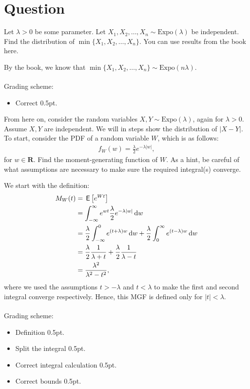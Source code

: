 \section*{Question}

\begin{exercise}[0.5]
Let $\lambda>0$ be some parameter. Let $X_1,X_2,\dots,X_n \sim\text{Expo}(\lambda)$ be independent. Find the distribution of $\min{\{X_1,X_2,\dots,X_n\}}$. You can use results from the book here.
\begin{solution}
By the book, we know that $\min{\{X_1,X_2,\dots,X_n\}}\sim\text{Expo}(n\lambda)$.
\\\\
Grading scheme:
\begin{itemize}
    \item Correct 0.5pt.
\end{itemize}
\end{solution}
\end{exercise}

\begin{exercise}[2]
From here on, consider the random variables $X,Y\sim\text{Expo}(\lambda)$, again for $\lambda>0$. Assume $X,Y$ are independent. We will in steps show the distribution of $\left|X-Y\right|$.\\ To start, consider the PDF of a random variable $W$, which is as follows:
\begin{align*}
    f_W(w) = \frac{\lambda}{2}e^{-\lambda\left|w\right|},
\end{align*}
for $w\in\mathbf{R}$. Find the moment-generating function of $W$. As a hint, be careful of what assumptions are necessary to make sure the required integral(s) converge.
\begin{solution}
We start with the definition:
\begin{align*}
    M_W(t) &= \E{e^{W t}}\\%
    &= \int_{-\infty}^\infty{e^{w t}\frac{\lambda}{2}e^{-\lambda\left|w\right|}\d w}\\
    &= \frac{\lambda}{2}\int_{-\infty}^0{e^{(t+\lambda) w}\d w} + \frac{\lambda}{2}\int_{0}^\infty{e^{(t-\lambda) w}\d w}\\
    &= \frac{\lambda}{2}\frac{1}{\lambda+t}+\frac{\lambda}{2}\frac{1}{\lambda-t}\\
    &= \frac{\lambda^2}{\lambda^2-t^2},
\end{align*}
where we used the assumptions $t>-\lambda$ and $t<\lambda$ to make the first and second integral converge respectively. Hence, this MGF is defined only for $\left|t\right|<\lambda$.
\\\\
Grading scheme:
\begin{itemize}
    \item Definition 0.5pt.
    \item Split the integral 0.5pt.
    \item Correct integral calculation 0.5pt.
    \item Correct bounds 0.5pt.
\end{itemize}
\end{solution}
\end{exercise}

